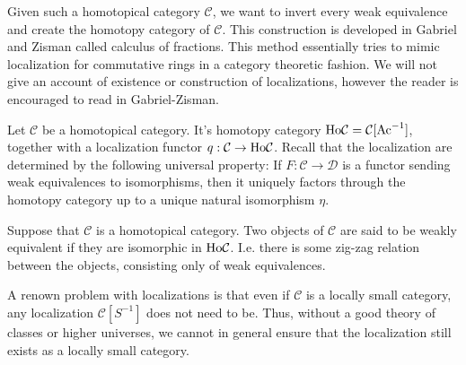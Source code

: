 \documentclass[../thesis.tex]{subfiles}
\begin{document}
            Given such a homotopical category $\mathcal{C}$, we want to invert every weak equivalence and create the homotopy category of $\mathcal{C}$. This construction is developed in Gabriel and Zisman \cite{Zisman67} called calculus of fractions. This method essentially tries to mimic localization for commutative rings in a category theoretic fashion. We will not give an account of existence or construction of localizations, however the reader is encouraged to read in Gabriel-Zisman.

            \begin{definition}
                Let $\mathcal{C}$ be a homotopical category. It's homotopy category $\tt{Ho}\mathcal{C} = \mathcal{C}[\tt{Ac}^{-1}]$, together with a localization functor $q:\mathcal{C}\rightarrow \tt{Ho}\mathcal{C}$. Recall that the localization are determined by the following universal property: If $F:\mathcal{C}\rightarrow \mathcal{D}$ is a functor sending weak equivalences to isomorphisms, then it uniquely factors through the homotopy category up to a unique natural isomorphism $\eta$.

                \begin{center}
                \end{center}
            \end{definition}

            \begin{definition}
                Suppose that $\mathcal{C}$ is a homotopical category. Two objects of $\mathcal{C}$ are said to be weakly equivalent if they are isomorphic in $\tt{Ho}\mathcal{C}$. I.e. there is some zig-zag relation between the objects, consisting only of weak equivalences.
            \end{definition}

            \begin{remark}
                A renown problem with localizations is that even if $\mathcal{C}$ is a locally small category, any localization $\mathcal{C}[S^{-1}]$ does not need to be. Thus, without a good theory of classes or higher universes, we cannot in general ensure that the localization still exists as a locally small category.
            \end{remark}
\end{document}
